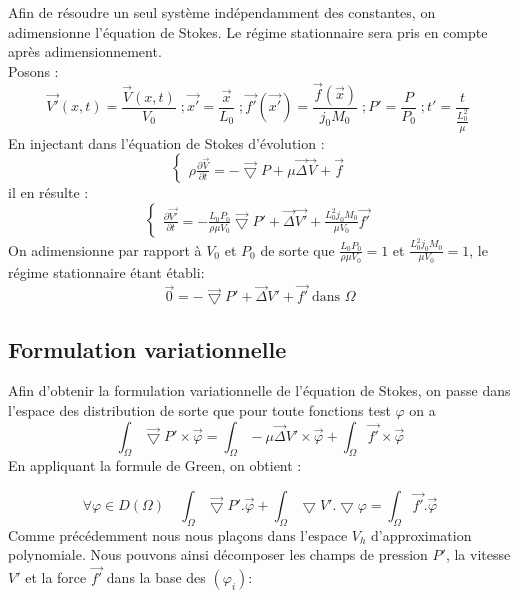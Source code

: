 \documentclass[a4paper,12pt,titlepage]{report}
\begin{document}
\begin{onehalfspace}
\normalsize Afin de résoudre un seul système indépendamment des constantes, on adimensionne l'équation de Stokes. Le régime stationnaire sera pris en compte après adimensionnement.
\\%
Posons :
\begin{equation*}
\vec{V'}(x,t)=\frac{\vec{V}(x,t)}{V_0}\;;\vec{x'}=\frac{\vec{x}}{L_0}\; ; \vec{f'}(\vec{x'})=\frac{\vec{f}(\vec{x})}{j_0M_0}\;;P'=\frac{P}{P_0}\; ;t'=\frac{t}{\frac{L_0^2}{\mu}}\;
\end{equation*}
En injectant dans l'équation de Stokes d'évolution :
\begin{equation*}
  \left\{
    \begin{aligned}
    \rho\frac{\partial \vec{V}}{\partial t}=-\vec{\bigtriangledown} P + \mu \vec{\Delta}\vec{V}+\vec{f}
        \end{aligned}
  \right.
\end{equation*}
il en résulte :
\begin{equation*}
  \left\{
    \begin{aligned}
    \frac{\partial \vec{V'}}{\partial t}=-\frac{L_0 P_0}{\rho \mu V_0}\vec{\bigtriangledown} P '+  \vec{\Delta}\vec{V'}+\frac{L_0^2j_0M_0}{\mu V_0}\vec{f'}
        \end{aligned}
  \right.
\end{equation*}
On adimensionne par rapport à $V_0$ et $P_0$ de sorte que $\frac{L_0 P_0}{\rho \mu V_0}=1$ et $ \frac{L_0^2j _0M_0}{\mu V_0}=1$, le régime stationnaire étant établi:
\[
      \vec{0}=-\vec{\bigtriangledown}P' +\vec{\Delta}V' +\vec{f'}\;\text{dans }\Omega 
\]

\subsection{Formulation variationnelle}

Afin d'obtenir la formulation variationnelle de l'équation de Stokes, on passe dans l'espace des distribution de sorte que pour toute fonctions test $\varphi$ on a 
\[
	\int_\Omega\vec{\bigtriangledown}P'\times \vec \varphi=\int_\Omega-\mu\vec{\Delta}V'\times \vec \varphi +\int_\Omega\vec{f'}\times \vec \varphi 
\]
En appliquant la formule de Green, on obtient :

\[
\forall \varphi \in D(\Omega) \quad  \int_\Omega\vec{\bigtriangledown}P'. \vec \varphi + \int_{\Omega}\bigtriangledown V'. \bigtriangledown \varphi = \int_\Omega\vec{f'}. \vec \varphi
\]
Comme précédemment nous nous plaçons dans l'espace $V_{h}$ d'approximation polynomiale.
Nous pouvons ainsi décomposer les champs de pression $P'$, la vitesse $V'$ et la force $\vec{f'}$ dans la base des $(\varphi_{i})$:


\end{onehalfspace}
\end{document}
